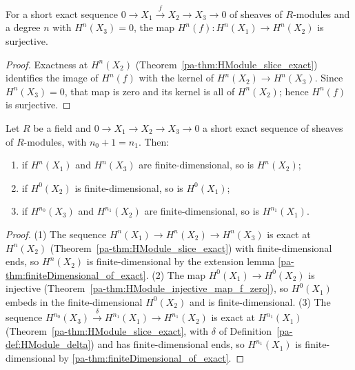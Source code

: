 \begin{theorem}
  \label{pa-thm:HModule_surjective_map_f}
  \leanok

  For a short exact sequence \(0 \to X_1 \xrightarrow{f} X_2 \to X_3 \to 0\) of sheaves of
  \(R\)-modules and a degree \(n\) with \(H^n(X_3) = 0\), the map
  \(H^n(f) : H^n(X_1) \to H^n(X_2)\) is surjective.
\end{theorem}
\begin{proof}
  \leanok
  Exactness at \(H^n(X_2)\) (Theorem~\ref{pa-thm:HModule_slice_exact}) identifies the image of
  \(H^n(f)\) with the kernel of \(H^n(X_2) \to H^n(X_3)\). Since \(H^n(X_3) = 0\), that map is
  zero and its kernel is all of \(H^n(X_2)\); hence \(H^n(f)\) is surjective.
\end{proof}

\begin{theorem}
  \label{pa-thm:HModule_finiteness_transfer}
  \leanok

  Let \(R\) be a field and \(0 \to X_1 \to X_2 \to X_3 \to 0\) a short exact sequence of sheaves
  of \(R\)-modules, with \(n_0 + 1 = n_1\). Then:
  \begin{enumerate}
    \item if \(H^n(X_1)\) and \(H^n(X_3)\) are finite-dimensional, so is \(H^n(X_2)\);
    \item if \(H^0(X_2)\) is finite-dimensional, so is \(H^0(X_1)\);
    \item if \(H^{n_0}(X_3)\) and \(H^{n_1}(X_2)\) are finite-dimensional, so is \(H^{n_1}(X_1)\).
  \end{enumerate}
\end{theorem}
\begin{proof}
  \leanok
  (1) The sequence \(H^n(X_1) \to H^n(X_2) \to H^n(X_3)\) is exact at \(H^n(X_2)\)
  (Theorem~\ref{pa-thm:HModule_slice_exact}) with finite-dimensional ends, so \(H^n(X_2)\) is
  finite-dimensional by the extension lemma \ref{pa-thm:finiteDimensional_of_exact}. (2) The map
  \(H^0(X_1) \to H^0(X_2)\) is injective (Theorem~\ref{pa-thm:HModule_injective_map_f_zero}), so
  \(H^0(X_1)\) embeds in the finite-dimensional \(H^0(X_2)\) and is finite-dimensional. (3) The
  sequence \(H^{n_0}(X_3) \xrightarrow{\delta} H^{n_1}(X_1) \to H^{n_1}(X_2)\) is exact at
  \(H^{n_1}(X_1)\) (Theorem~\ref{pa-thm:HModule_slice_exact}, with \(\delta\) of
  Definition~\ref{pa-def:HModule_delta}) and has finite-dimensional ends, so \(H^{n_1}(X_1)\) is
  finite-dimensional by \ref{pa-thm:finiteDimensional_of_exact}.
\end{proof}

